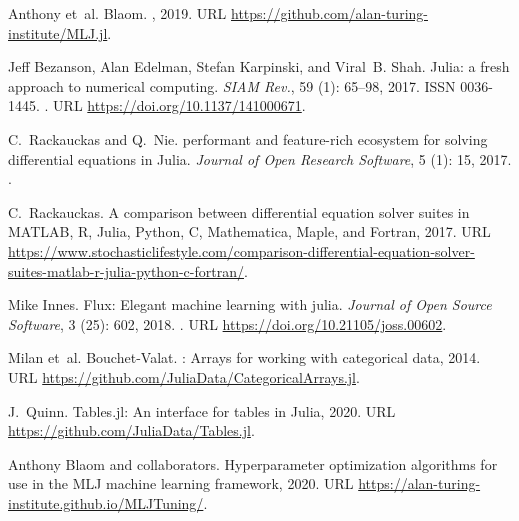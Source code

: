\documentclass{article}
\begin{document}
\begin{thebibliography}{18}
Anthony et~al. Blaom.
, 2019.
\newblock URL \url{https://github.com/alan-turing-institute/MLJ.jl}.

Jeff Bezanson, Alan Edelman, Stefan Karpinski, and Viral~B. Shah.
\newblock Julia: a fresh approach to numerical computing.
\newblock \emph{SIAM Rev.}, 59 (1): 65--98, 2017.
\newblock ISSN 0036-1445.
\newblock {}.
\newblock URL \url{https://doi.org/10.1137/141000671}.

C.~Rackauckas and Q.~Nie.
 performant and feature-rich
  ecosystem for solving differential equations in {J}ulia.
\newblock \emph{Journal of Open Research Software}, 5 (1):
  15, 2017.
\newblock {}.

C.~Rackauckas.
\newblock A comparison between differential equation solver suites in {MATLAB},
  {R}, {J}ulia, {P}ython, {C}, {M}athematica, {M}aple, and {F}ortran, 2017.
\newblock URL
  \url{https://www.stochasticlifestyle.com/comparison-differential-equation-solver-suites-matlab-r-julia-python-c-fortran/}.

Mike Innes.
\newblock Flux: Elegant machine learning with julia.
\newblock \emph{Journal of Open Source Software}, 3 (25):
  602, 2018.
\newblock {}.
\newblock URL \url{https://doi.org/10.21105/joss.00602}.

Milan et~al. Bouchet-Valat.
: {A}rrays for working with categorical data,
  2014.
\newblock URL \url{https://github.com/JuliaData/CategoricalArrays.jl}.

J.~Quinn.
\newblock Tables.jl: {A}n interface for tables in {J}ulia, 2020.
\newblock URL \url{https://github.com/JuliaData/Tables.jl}.

Anthony Blaom and collaborators.
\newblock Hyperparameter optimization algorithms for use in the {MLJ} machine
  learning framework, 2020.
\newblock URL \url{https://alan-turing-institute.github.io/MLJTuning/}.


\end{thebibliography}
\end{document}
